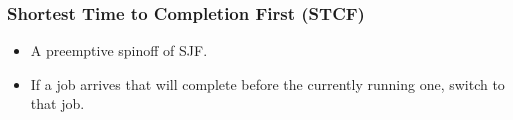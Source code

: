 \begin{frame}

\frametitle{Shortest Time to Completion First (STCF)}

\begin{itemize}

\item A preemptive spinoff of SJF.

\item If a job arrives that will complete before the currently running one,
switch to that job.

\end{itemize}

\end{frame}
